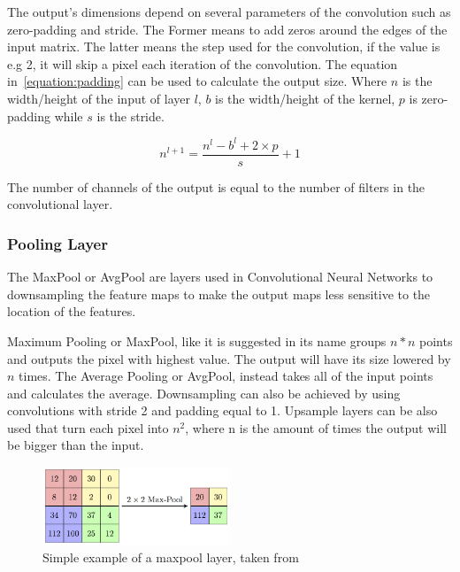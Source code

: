 The output's dimensions depend on several parameters of the convolution such as
zero-padding and stride. The Former means to add zeros around the edges of the
input matrix. The latter means the step used for the convolution, if the value
is e.g 2, it will skip a pixel each iteration of the convolution.  The equation
in~\ref{equation:padding} can be used to calculate the output size. Where $n$ is
the width/height of the input of layer $l$, $ b$ is the width/height of the
kernel, $p$ is zero-padding while $s$ is the stride.

\begin{equation} \label{equation:padding}
     n^{l+1} = \frac{n^{l}- b^{l}+2 \times p}{s} + 1
\end{equation}

The number of channels of the output is equal to the number of filters in the
convolutional layer.



\subsubsection{Pooling Layer}

The MaxPool or AvgPool are layers used in Convolutional Neural Networks to
downsampling the feature maps to make the output maps less sensitive to the
location of the features.

Maximum Pooling or MaxPool, like it is suggested in its name groups $ n * n $
points and outputs the pixel with highest value.  The output will have its size
lowered by $ n $ times.  The Average Pooling or AvgPool, instead takes all of
the input points and calculates the average. Downsampling can also be achieved
by using convolutions with stride 2 and padding equal to 1.  Upsample layers can
be also used that turn each pixel into $ n^{2} $, where n is the amount of times
the output will be bigger than the input.

\begin{figure}[!htbp]
    \centering
    \includegraphics[width=0.5\textwidth]{Figures/maxpool.png}
    \caption{Simple example of a maxpool layer, taken from~\cite{maxpoolimg}}
    \label{figure:maxpool}
\end{figure} 
 

